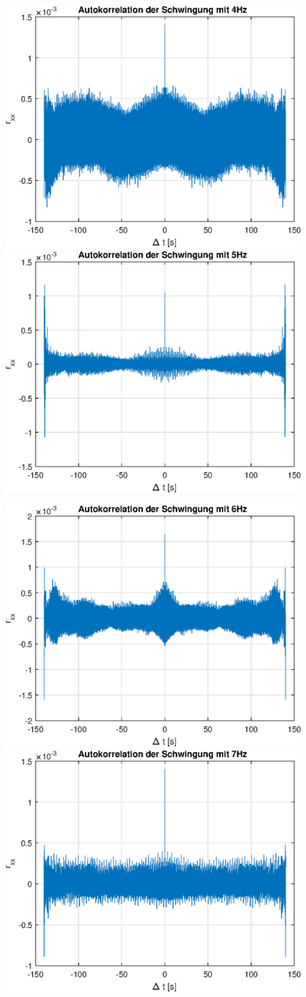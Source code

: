 \documentclass{article}
\begin{document}
\begin{figure}[!h]
\includegraphics[width=0.5\linewidth]{img/rxx_sinefreq_4}
\includegraphics[width=0.5\linewidth]{img/rxx_sinefreq_5}
\end{figure}
\begin{figure}[!h]
\includegraphics[width=0.5\linewidth]{img/rxx_sinefreq_6}
\includegraphics[width=0.5\linewidth]{img/rxx_sinefreq_7}
\end{figure}
\end{document}
